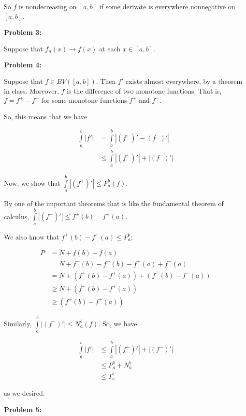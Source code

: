 \documentclass[a4paper,12pt]{article}
\newcommand{\tab}{\hspace{4mm}} %
\newcommand{\shunt}{\vspace{20mm}}
\newcommand{\absval}[1]{\left\lvert #1 \right\rvert}
\begin{document}
So $f$ is nondecreasing on $[a,b]$ if some derivate is everywhere nonnegative on $[a,b]$.

\shunt

{\bf Problem 3:} 

Suppose that $f_n(x) \to f(x)$ at each $x \in [a,b]$.



\shunt

{\bf Problem 4:} 

Suppose that $f \in BV([a,b])$. 
Then $f'$ exists almost everywhere, by a theorem in class. 
Moreover, $f$ is the difference of two monotone functions. 
That is, $f= f^+ -f^-$ for some monotone functions $f^+$ and $f^-$.

So, this means that we have

\begin{align*}
\int\limits_a^b \absval{f'} &= \int\limits_a^b \absval{(f^+)' - (f^-)'} \\
&\leq \int\limits_a^b \absval{(f^+)'} + \absval{(f^-)'}
\end{align*}

Now, we show that $\int\limits_a^b \absval{(f^+)'} \leq P_a^b(f)$.

\tab By one of the important theorems that is like the fundamental theorem of calculus, $\int\limits_a^b \absval{(f^+)'} \leq f^+(b)-f^+(a)$.

\tab We also know that $f^+(b) - f^+(a) \leq P_a^b$; 

\begin{align*}
P &= N +f(b)-f(a)\\
&=N+f^+(b)-f^-(b)-f^+(a)+f^-(a)\\
&=N+(f^+(b)-f^+(a))+(f^-(b)-f^-(a))\\
&\geq N+(f^+(b)-f^+(a))\\
&\geq (f^+(b)-f^+(a))
\end{align*}

Similarly, $\int\limits_a^b \absval{(f^-)'} \leq N_a^b(f)$. So, we have

\begin{align*}
\int\limits_a^b \absval{f'} &\leq \int\limits_a^b \absval{(f^+)'} + \absval{(f^-)'}\\
&\leq P_a^b + N_a^b \\
&\leq T_a^b
\end{align*}

as we desired.

\shunt

{\bf Problem 5:} %
\end{document}
